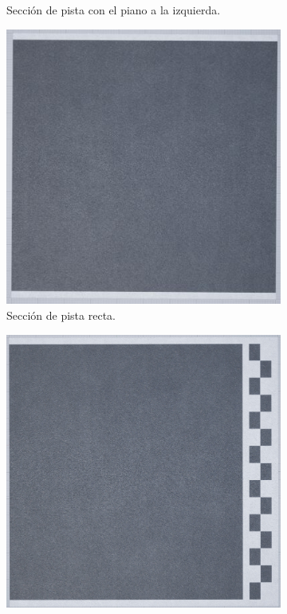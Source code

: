 \begin{figure}[H]
\begin{subfigure}[t]{0.48\textwidth}
        \caption{Sección de pista con el piano a la izquierda.}
        \label{fig:curvafinal3}
    \end{subfigure}
    \par\bigskip
    \begin{subfigure}[t]{0.48\textwidth}
        \centering
        \includegraphics[width=\textwidth]{imagenes/converted/pista/track-straight-final.jpg}
        \caption{Sección de pista recta.}
        \label{fig:curvafinal1}
    \end{subfigure}
    \hfill
    \begin{subfigure}[t]{0.48\textwidth}
        \centering
        \includegraphics[width=\textwidth]{imagenes/converted/pista/track-finish-line-final.jpg}

\end{subfigure}
\end{figure}
